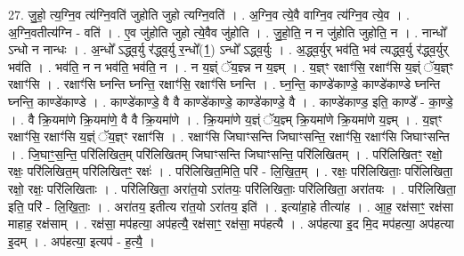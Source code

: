 \documentclass[17pt]{extarticle}
\begin{document}
27. जु॒हो॒ त्य॒ग्नि॒व त्य॑ग्नि॒वति॑ जुहोति जुहो त्यग्नि॒वति॑ । . अ॒ग्नि॒व त्ये॒वै वाग्नि॒व त्य॑ग्नि॒व त्ये॒व । . अ॒ग्नि॒वतीत्य॑ग्नि - वति॑ । . ए॒व जु॑होति जुहो त्ये॒वैव जु॑होति । . जु॒हो॒ति॒ न न जु॑होति जुहोति॒ न । . नान्धो᳚ ऽन्धो न नान्धः । . अ॒न्धो᳚ ऽद्ध्व॒र्यु र॑द्ध्व॒र्यु र॒न्धो᳚(1॒) ऽन्धो᳚ ऽद्ध्व॒र्युः । . अ॒द्ध्व॒र्युर् भव॑ति॒ भव॑ त्यद्ध्व॒र्यु र॑द्ध्व॒र्युर् भव॑ति । . भव॑ति॒ न न भव॑ति॒ भव॑ति॒ न । . न य॒ज्ञ्ं ॅय॒ज्ञ्न्न न य॒ज्ञ्म् । . य॒ज्ञ्ꣳ रक्षाꣳ॑सि॒ रक्षाꣳ॑सि य॒ज्ञ्ं ॅय॒ज्ञ्ꣳ रक्षाꣳ॑सि । . रक्षाꣳ॑सि घ्नन्ति घ्नन्ति॒ रक्षाꣳ॑सि॒ रक्षाꣳ॑सि घ्नन्ति । . घ्न॒न्ति॒ काण्डे॑काण्डे॒ काण्डे॑काण्डे घ्नन्ति घ्नन्ति॒ काण्डे॑काण्डे । . काण्डे॑काण्डे॒ वै वै काण्डे॑काण्डे॒ काण्डे॑काण्डे॒ वै । . काण्डे॑काण्ड॒ इति॒ काण्डे᳚ - का॒ण्डे॒ । . वै क्रि॒यमा॑णे क्रि॒यमा॑णे॒ वै वै क्रि॒यमा॑णे । . क्रि॒यमा॑णे य॒ज्ञ्ं ॅय॒ज्ञ्म् क्रि॒यमा॑णे क्रि॒यमा॑णे य॒ज्ञ्म् । . य॒ज्ञ्ꣳ रक्षाꣳ॑सि॒ रक्षाꣳ॑सि य॒ज्ञ्ं ॅय॒ज्ञ्ꣳ रक्षाꣳ॑सि । . रक्षाꣳ॑सि जिघाꣳसन्ति जिघाꣳसन्ति॒ रक्षाꣳ॑सि॒ रक्षाꣳ॑सि जिघाꣳसन्ति । . जि॒घाꣳ॒॒स॒न्ति॒ परि॑लिखित॒म् परि॑लिखितम् जिघाꣳसन्ति जिघाꣳसन्ति॒ परि॑लिखितम् । . परि॑लिखितꣳ॒॒ रक्षो॒ रक्षः॒ परि॑लिखित॒म् परि॑लिखितꣳ॒॒ रक्षः॑ । . परि॑लिखित॒मिति॒ परि॑ - लि॒खि॒त॒म् । . रक्षः॒ परि॑लिखिताः॒ परि॑लिखिता॒ रक्षो॒ रक्षः॒ परि॑लिखिताः । . परि॑लिखिता॒ अरा॑त॒यो ऽरा॑तयः॒ परि॑लिखिताः॒ परि॑लिखिता॒ अरा॑तयः । . परि॑लिखिता॒ इति॒ परि॑ - लि॒खि॒ताः॒ । . अरा॑तय॒ इतीत्य रा॑त॒यो ऽरा॑तय॒ इति॑ । . इत्या॑हा॒हे तीत्या॑ह । . आ॒ह॒ रक्ष॑साꣳ॒॒ रक्ष॑सा माहाह॒ रक्ष॑साम् । . रक्ष॑सा॒ मप॑हत्या॒ अप॑हत्यै॒ रक्ष॑साꣳ॒॒ रक्ष॑सा॒ मप॑हत्यै । . अप॑हत्या इ॒द मि॒द मप॑हत्या॒ अप॑हत्या इ॒दम् । . अप॑हत्या॒ इत्यप॑ - ह॒त्यै॒ । \newline
\end{document}
